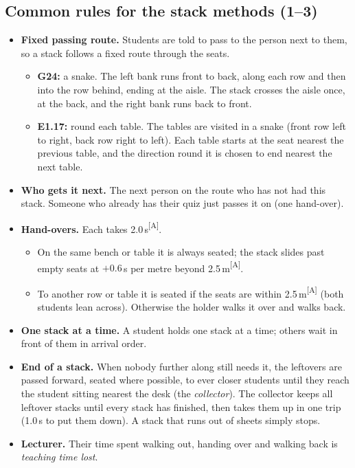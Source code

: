 \documentclass[11pt,a4paper]{article}
\newcommand{\assume}{\textcolor{flag}{\textsuperscript{[A]}}}
\begin{document}
\subsection{Common rules for the stack methods (1--3)}\label{sec:route}
\begin{itemize}
  \item \textbf{Fixed passing route.} Students are told to pass to the person next to them, so a stack follows a fixed route through the seats.
  \begin{itemize}
    \item \textbf{G24:} a snake. The left bank runs front to back, along each row and then into the row behind, ending at the aisle. The stack crosses the aisle once, at the back, and the right bank runs back to front.
    \item \textbf{E1.17:} round each table. The tables are visited in a snake (front row left to right, back row right to left). Each table starts at the seat nearest the previous table, and the direction round it is chosen to end nearest the next table.
  \end{itemize}
  \item \textbf{Who gets it next.} The next person on the route who has not had this stack. Someone who already has their quiz just passes it on (one hand-over).
  \item \textbf{Hand-overs.} Each takes 2.0\,s\assume.
  \begin{itemize}
    \item On the same bench or table it is always seated; the stack slides past empty seats at $+0.6$\,s per metre beyond 2.5\,m\assume.
    \item To another row or table it is seated if the seats are within 2.5\,m\assume{} (both students lean across). Otherwise the holder walks it over and walks back.
  \end{itemize}
  \item \textbf{One stack at a time.} A student holds one stack at a time; others wait in front of them in arrival order.
  \item \textbf{End of a stack.} When nobody further along still needs it, the leftovers are passed forward, seated where possible, to ever closer students until they reach the student sitting nearest the desk (the \emph{collector}). The collector keeps all leftover stacks until every stack has finished, then takes them up in one trip (1.0\,s to put them down). A stack that runs out of sheets simply stops.
  \item \textbf{Lecturer.} Their time spent walking out, handing over and walking back is \emph{teaching time lost}.
\end{itemize}
\end{document}
